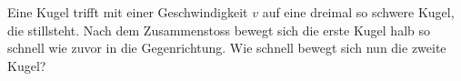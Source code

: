 Eine Kugel trifft mit einer Geschwindigkeit $v$ auf eine dreimal so schwere Kugel, die stillsteht. Nach dem Zusammenstoss bewegt sich die erste Kugel halb so schnell wie zuvor in die Gegenrichtung. Wie schnell bewegt sich nun die zweite Kugel?
